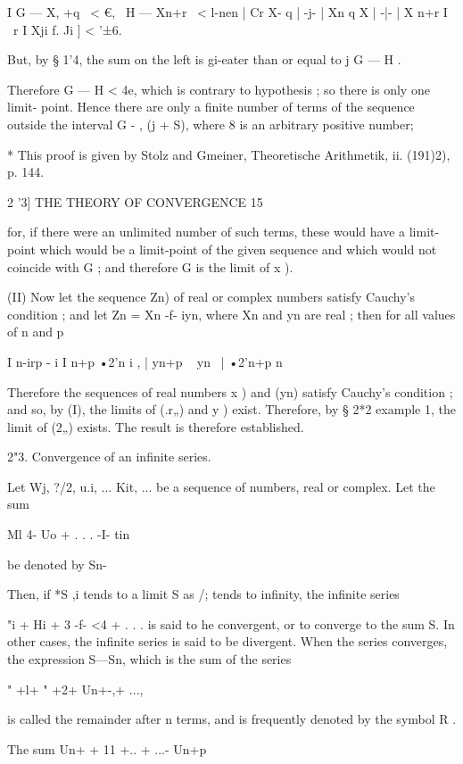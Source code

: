 I G — X, +q \ < €, \ H — Xn+r \ <   
l-nen | Cr X- q | -j- | Xn q X  | -|- | X n+r I ~r I Xji f. Ji ] < '±6. 

But, by § 1'4, the sum on the left is gi-eater than or equal to j G — H .  

Therefore G — H < 4e, which is contrary to hypothesis ; so there is only 
one limit- point. Hence there are only a finite number of terms of the sequence 
outside the interval  G -  , (j + S), where 8 is an arbitrary positive number; 

* This proof is given by Stolz and Gmeiner, Theoretische Arithmetik, ii. (191)2), p. 144. 



2 '3] THE THEORY OF CONVERGENCE 15 

for, if there were an unlimited number of such terms, these would have a 
limit-point which would be a limit-point of the given sequence and which 
would not coincide with G ; and therefore G is the limit of  x ). 

(II) Now let the sequence  Zn) of real or complex numbers satisfy 
Cauchy's condition ; and let Zn = Xn -f- iyn, where Xn and yn are real ; then for 
all values of n and p 

I  n-irp -    i   I  n+p •2'n i , | yn+p ~ yn \   | •2'n+p  n\- 

Therefore the sequences of real numbers  x ) and (yn) satisfy Cauchy's 
condition ; and so, by (I), the limits of (.r„) and  y ) exist. Therefore, by 
§ 2*2 example 1, the limit of (2„) exists. The result is therefore established. 

2"3. Convergence of an infinite series. 

Let Wj, ?/2, u.i, ... Kit, ... be a sequence of numbers, real or complex. Let 
the sum 

Ml 4- Uo + . . . -I- tin 

be denoted by Sn- 

Then, if *S ,i tends to a limit S as /; tends to infinity, the infinite series 

"i + Hi +  3 -f-  <4 + . . . 
is said to he convergent, or to converge to the sum S. In other cases, the 
infinite series is said to be divergent. When the series converges, the 
expression S—Sn, which is the sum of the series 

" +l+ " +2+ Un+-,+ ..., 

is called the remainder after n terms, and is frequently denoted by the 
symbol R . 

The sum Un+  + 11 +.. + ...-\- Un+p 

